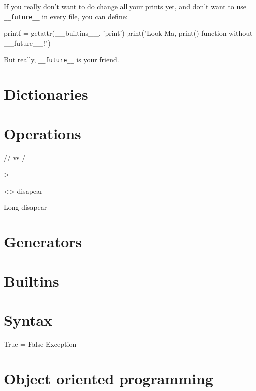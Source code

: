 If you really don't want to do change all your prints yet, and don't want to use \lstinline{__future__} in every file, you can define:

\begin{py}
printf = getattr(__builtins__, 'print')
print("Look Ma, print() function without __future__!")
\end{py}

But really, \lstinline{__future__} is your friend.

\section{Dictionaries}

\section{Operations}

// vs /

>

<> disapear

Long disapear

\section{Generators}

\section{Builtins}

\section{Syntax}

True = False
Exception

\section{Object oriented programming}

